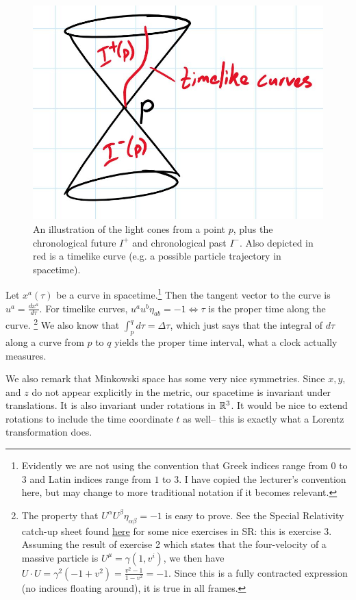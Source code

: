 \begin{figure}
\includegraphics{2018/10/20181005_img1}
\caption{An illustration of the light cones from a point $p$, plus the chronological future $I^+$ and chronological past $I^-$. Also depicted in red is a timelike curve (e.g. a possible particle trajectory in spacetime).}
\end{figure}

Let $x^a(\tau)$ be a curve in spacetime.\footnote{Evidently we are not using the convention that Greek indices range from $0$ to $3$ and Latin indices range from $1$ to $3$. I have copied the lecturer's convention here, but may change to more traditional notation if it becomes relevant.} Then the tangent vector to the curve is $u^a=\frac{dx^a}{d\tau}$. For timelike curves, $u^a u^b \eta_{ab}=-1 \iff \tau$ is the proper time along the curve.
\footnote{The property that $U^\alpha U^\beta \eta_{\alpha\beta}=-1$ is easy to prove. See the Special Relativity catch-up sheet found \href{http://www.maths.cam.ac.uk/sites/www.maths.cam.ac.uk/files/grspecialrelativity.pdf}{here} for some nice exercises in SR: this is exercise 3. Assuming the result of exercise 2 which states that the four-velocity of a massive particle is $U^\mu=\gamma(1,v^i)$, we then have $U\cdot U =\gamma^2(-1+v^2)=\frac{v^2-1}{1-v^2}=-1$. Since this is a fully contracted expression (no indices floating around), it is true in all frames.}
We also know that $\int_p^q d\tau = \Delta \tau$, which just says that the integral of $d\tau$ along a curve from $p$ to $q$ yields the proper time interval, what a clock actually measures.

We also remark that Minkowski space has some very nice symmetries. Since $x,y,$ and $z$ do not appear explicitly in the metric, our spacetime is invariant under translations. It is also invariant under rotations in $\mathbb{R}^3$. It would be nice to extend rotations to include the time coordinate $t$ as well-- this is exactly what a Lorentz transformation does.

